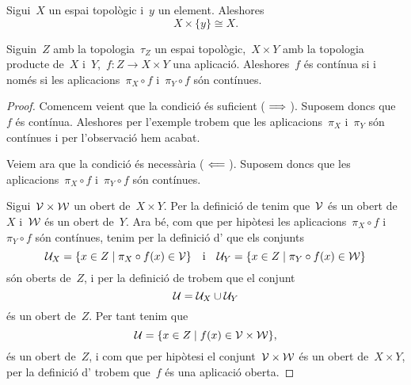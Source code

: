 \documentclass[../../main.tex]{subfiles}
\begin{document}
    \begin{corollary} %
        \label{cor:un espai topològic producte amb un element és homeomorf a l'espai topològic}
        Sigui~\(X\) un espai topològic i~\(y\) un element.
        Aleshores
        \[
            X\times\{y\}\cong X.
        \]
    \end{corollary}
    \begin{theorem}
        \label{thm:una aplicació és contínua si i només si les seves components són contínues}
        Siguin~\(Z\) amb la topologia~\(\tau_{Z}\) un espai topològic,~\(X\times Y\) amb la topologia producte de~\(X\) i~\(Y\),~\(f\colon Z\longrightarrow X\times Y\) una aplicació.
        Aleshores~\(f\) és contínua si i només si les aplicacions~\(\pi_{X}\circ f\) i~\(\pi_{Y}\circ f\) són contínues.
        \begin{proof}
            Comencem veient que la condició és suficient (\(\implies\)).
            Suposem doncs que~\(f\) és contínua.
            Aleshores per l'exemple  trobem que les aplicacions~\(\pi_{X}\) i~\(\pi_{Y}\) són contínues i per l'observació  hem acabat.

            Veiem ara que la condició és necessària (\(\impliedby\)).
            Suposem doncs que les aplicacions~\(\pi_{X}\circ f\) i~\(\pi_{Y}\circ f\) són contínues.

            Sigui~\(\mathcal{V}\times\mathcal{W}\) un obert de~\(X\times Y\).
            Per la definició de  tenim que~\(\mathcal{V}\) és un obert de~\(X\) i~\(\mathcal{W}\) és un obert de~\(Y\).
            Ara bé, com que per hipòtesi les aplicacions~\(\pi_{X}\circ f\) i~\(\pi_{Y}\circ f\) són contínues, tenim per la definició d' que els conjunts
            \[\mathcal{U}_{X}=\{x\in Z\mid \pi_{X}\circ f(x)\in\mathcal{V}\}\quad\text{i}\quad
            \mathcal{U}_{Y}=\{x\in Z\mid \pi_{Y}\circ f(x)\in\mathcal{W}\}\]
            són oberts de~\(Z\), i per la definició de  trobem que el conjunt
            \[
                \mathcal{U}=\mathcal{U}_{X}\cup\mathcal{U}_{Y}
            \]
            és un obert de~\(Z\).
            Per tant tenim que
            \[
                \mathcal{U}=\{x\in Z\mid f(x)\in\mathcal{V}\times\mathcal{W}\},
            \]
            és un obert de~\(Z\), i com que per hipòtesi el conjunt~\(\mathcal{V}\times\mathcal{W}\) és un obert de~\(X\times Y\), per la definició d' trobem que~\(f\) és una aplicació oberta.
        \end{proof}
    \end{theorem}
\end{document}
